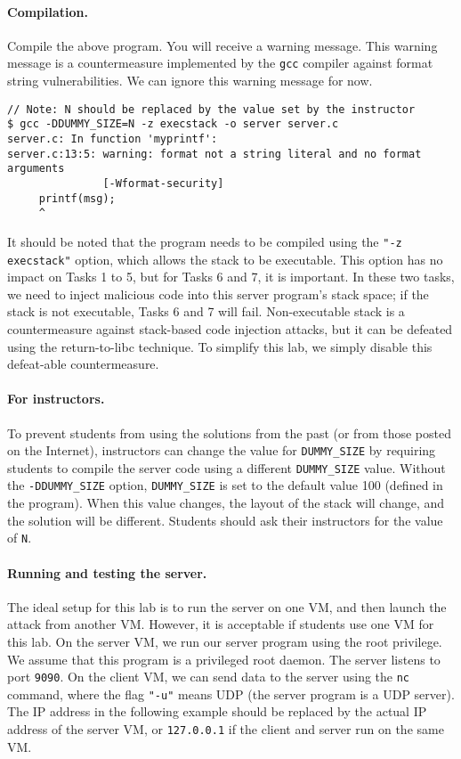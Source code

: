 \paragraph{Compilation.} Compile the above program. You will receive a
warning message. This warning message is a countermeasure implemented by
the \texttt{gcc} compiler against format string vulnerabilities. We can
ignore this warning message for now. 


\begin{lstlisting}
// Note: N should be replaced by the value set by the instructor
$ gcc -DDUMMY_SIZE=N -z execstack -o server server.c
server.c: In function 'myprintf':
server.c:13:5: warning: format not a string literal and no format arguments 
               [-Wformat-security]
     printf(msg);
     ^
\end{lstlisting}

It should be noted that the program needs to be compiled using 
the \texttt{"-z execstack"} option, which allows the stack to be 
executable. This option has no impact on Tasks 1 to 5, but for 
Tasks 6 and 7, it is important. In these 
two tasks, we need to inject malicious code into this server program's stack space; 
if the  stack is not executable, Tasks 6 and 7 will fail. 
Non-executable stack is a countermeasure against stack-based 
code injection attacks, but 
it can be defeated using the return-to-libc technique. To simplify 
this lab, we simply disable this defeat-able countermeasure. 


\paragraph{For instructors.} 
To prevent students from using the solutions from the past (or from those 
posted on the Internet), instructors can change the 
value for \texttt{DUMMY\_SIZE} by requiring students to compile the 
server code using a different \texttt{DUMMY\_SIZE} value. 
Without the \texttt{-DDUMMY\_SIZE}  
option, \texttt{DUMMY\_SIZE} is set to the default value 100 (defined
in the program). 
When this value changes, the layout of the stack 
will change, and the solution will be different. 
Students should ask their instructors for
the value of \texttt{N}.




\paragraph{Running and testing the server.} The ideal setup for this lab is
to run the server on one VM, and then launch the attack from another VM.
However, it is acceptable if students use one VM for this lab.
On the server VM, we run our server program using the root privilege. We
assume that this program is a privileged root daemon. The server listens to
port \texttt{9090}. On the client VM, we can send data to the server using 
the \texttt{nc} command, where the flag \texttt{"-u"} means UDP (the server
program is a UDP server). The IP address in the following example should be 
replaced by the actual IP address of the server VM, or \texttt{127.0.0.1}
if the client and server run on the same VM. 

